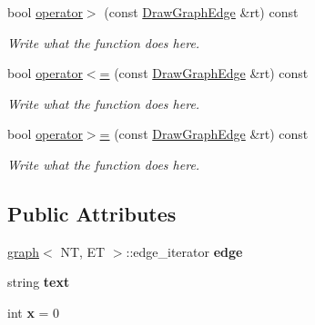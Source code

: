 \begin{DoxyCompactItemize}
bool \hyperlink{structGraphingInternals_1_1DrawGraphEdge_a770c68dac507b11e084f671d355aa51b}{operator$>$} (const \hyperlink{structGraphingInternals_1_1DrawGraphEdge}{Draw\+Graph\+Edge} \&rt) const 
\begin{DoxyCompactList}\small\item\em Write what the function does here. \end{DoxyCompactList}\item 
bool \hyperlink{structGraphingInternals_1_1DrawGraphEdge_a440063310fa37ef3533a5041223a8bd8}{operator$<$=} (const \hyperlink{structGraphingInternals_1_1DrawGraphEdge}{Draw\+Graph\+Edge} \&rt) const 
\begin{DoxyCompactList}\small\item\em Write what the function does here. \end{DoxyCompactList}\item 
bool \hyperlink{structGraphingInternals_1_1DrawGraphEdge_a9a27d32d2ab80cc936cc816d9b339713}{operator$>$=} (const \hyperlink{structGraphingInternals_1_1DrawGraphEdge}{Draw\+Graph\+Edge} \&rt) const 
\begin{DoxyCompactList}\small\item\em Write what the function does here. \end{DoxyCompactList}\end{DoxyCompactItemize}
\subsection*{Public Attributes}
\begin{DoxyCompactItemize}
\item 
\hypertarget{structGraphingInternals_1_1DrawGraphEdge_a4d75439edb795681094d4e3e36582caa}{\hyperlink{classgraph}{graph}$<$ N\+T, E\+T $>$\+::edge\+\_\+iterator {\bfseries edge}}\label{structGraphingInternals_1_1DrawGraphEdge_a4d75439edb795681094d4e3e36582caa}

\item 
\hypertarget{structGraphingInternals_1_1DrawGraphEdge_a5df5d87890cb8baf7cf9b0fd8cf7b882}{string {\bfseries text}}\label{structGraphingInternals_1_1DrawGraphEdge_a5df5d87890cb8baf7cf9b0fd8cf7b882}

\item 
\hypertarget{structGraphingInternals_1_1DrawGraphEdge_a5d31e0762db1ad4dd2e45dfeaa7cb8f2}{int {\bfseries x} = 0}\label{structGraphingInternals_1_1DrawGraphEdge_a5d31e0762db1ad4dd2e45dfeaa7cb8f2}

\end{DoxyCompactItemize}



